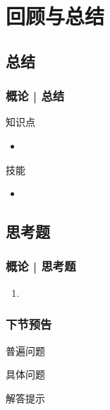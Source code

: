 \section{回顾与总结}
\subsection{总结}
\begin{frame}
  \frametitle{概论 | 总结}
  \begin{block}{知识点}
    \begin{itemize}
      \item 
    \end{itemize}
  \end{block}
  \begin{block}{技能}
    \begin{itemize}
      \item 
    \end{itemize}
  \end{block}
\end{frame}

\subsection{思考题}
\begin{frame}
  \frametitle{概论 | 思考题}
  \begin{enumerate}
    \item 
  \end{enumerate}
\end{frame}

\begin{frame}
  \frametitle{下节预告}
  \begin{block}{普遍问题}
  \end{block}
  \pause
  \begin{block}{具体问题}
  \end{block}
  \pause
  \begin{block}{解答提示}
  \end{block}
\end{frame}




